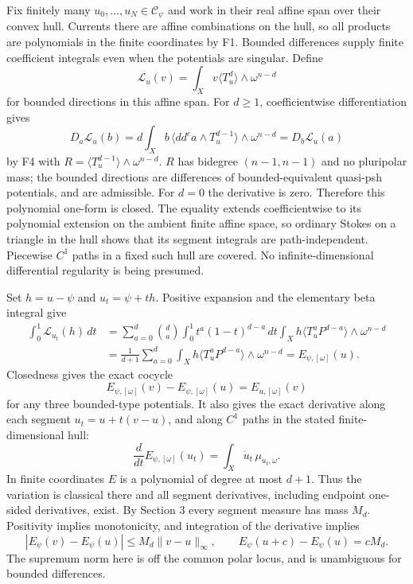 \documentclass[
  10pt,
]{article}
\begin{document}
Fix finitely many \(u_0,\ldots,u_N\in\mathcal{C}_\psi\) and work in their
real affine span over their convex hull. Currents there are affine
combinations on the hull, so all products are polynomials in the finite
coordinates by F1. Bounded differences supply finite coefficient
integrals even when the potentials are singular. Define \[
\mathcal{L}_u(v)=\int_X v\langle T_u^d\rangle\wedge\omega^{n-d}
\] for bounded directions in this affine span. For \(d\geq1\),
coefficientwise differentiation gives \[
D_a\mathcal{L}_u(b)=d\int_X b\,\langle dd^ca\wedge T_u^{d-1}\rangle\wedge\omega^{n-d}
=D_b\mathcal{L}_u(a)
\] by F4 with \(R=\langle T_u^{d-1}\rangle\wedge\omega^{n-d}\). \(R\)
has bidegree \((n-1,n-1)\) and no pluripolar mass; the bounded
directions are differences of bounded-equivalent quasi-psh potentials,
and are admissible. For \(d=0\) the derivative is zero. Therefore this
polynomial one-form is closed. The equality extends coefficientwise to
its polynomial extension on the ambient finite affine space, so ordinary
Stokes on a triangle in the hull shows that its segment integrals are
path-independent. Piecewise \(C^1\) paths in a fixed such hull are
covered. No infinite-dimensional differential regularity is being
presumed.

Set \(h=u-\psi\) and \(u_t=\psi+th\). Positive expansion and the
elementary beta integral give \[
\begin{aligned}
\int_0^1\mathcal{L}_{u_t}(h)\,dt
&=\sum_{a=0}^d\binom da\int_0^1t^a(1-t)^{d-a}\,dt
\int_Xh\langle T_u^aP^{d-a}\rangle\wedge\omega^{n-d}\\
&=\frac1{d+1}\sum_{a=0}^d\int_Xh\langle T_u^aP^{d-a}\rangle\wedge\omega^{n-d}=E_{\psi,[\omega]}(u).
\end{aligned}
\] Closedness gives the exact cocycle \[
E_{\psi,[\omega]}(v)-E_{\psi,[\omega]}(u)=E_{u,[\omega]}(v)
\] for any three bounded-type potentials. It also gives the exact
derivative along each segment \(u_t=u+t(v-u)\), and along \(C^1\) paths
in the stated finite-dimensional hull: \[
\frac d{dt}E_{\psi,[\omega]}(u_t)=\int_X\dot u_t\,\mu_{u_t,\omega}.
\] In finite coordinates \(E\) is a polynomial of degree at most
\(d+1\). Thus the variation is classical there and all segment
derivatives, including endpoint one-sided derivatives, exist. By Section
3 every segment measure has mass \(M_d\). Positivity implies
monotonicity, and integration of the derivative implies \[
|E_\psi(v)-E_\psi(u)|\leq M_d\|v-u\|_\infty,
\qquad E_\psi(u+c)-E_\psi(u)=cM_d.
\] The supremum norm here is off the common polar locus, and is
unambiguous for bounded differences.
\end{document}
